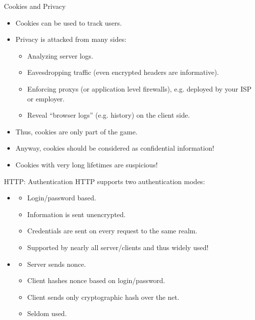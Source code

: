 \documentclass{beamer}
\begin{document}
\begin{slide}{Cookies and Privacy}
  \begin{itemize}\itemsep=2ex
    \item Cookies can be used to track users.
    \item Privacy is attacked from many sides:
    \begin{itemize}\itemsep=1.5ex
      \item Analyzing server logs. 
      \item Eavesdropping traffic (even encrypted headers are informative).
      \item Enforcing proxys (or application level firewalls), e.g.
        deployed by your ISP or employer.
      \item Reveal ``browser logs'' (e.g. history) on the client side.
    \end{itemize} 
    \item Thus, cookies are only part of the game.
    \item Anyway, cookies should be considered as \alert{confidential}
      information!
    \item Cookies with very long lifetimes are suspicious!
  \end{itemize}
\end{slide}
\begin{printout}
\begin{slide}{HTTP: Authentication}
  HTTP supports two authentication modes:
  \begin{itemize}\itemsep=2ex
    \item \textbf{}
    \begin{itemize}\itemsep=1.5ex
      \item Login/password based. 
      \item Information is sent unencrypted.
      \item Credentials are sent on every request to the same realm.
      \item Supported by nearly all server/clients and thus widely used!
    \end{itemize}
    \item \textbf{}
    \begin{itemize}\itemsep=1.5ex
      \item Server sends nonce.
      \item Client hashes nonce based on login/password. 
      \item Client sends only cryptographic hash over the net.
      \item Seldom used.
    \end{itemize}
  \end{itemize}
\end{slide}
\end{printout}
\end{document}

